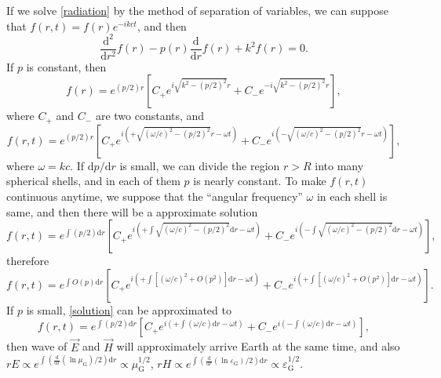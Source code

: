 \documentclass{article}
\def\d{\mathrm{d}}
\begin{document}
If we solve \eqref{radiation} by the method of separation of variables, we can suppose that $f(r,t)=f(r)e^{-ikct}$, and then
\begin{equation}\label{radiation_r}
    \frac{\d^2}{\d r^2}f(r)-p(r)\frac{\d}{\d r}f(r)+k^2f(r)=0.
\end{equation}
If $p$ is constant, then
\begin{equation}
    f(r)=e^{(p/2)r}[C_+e^{i\sqrt{k^2-(p/2)^2}r}+C_-e^{-i\sqrt{k^2-(p/2)^2}r}],
\end{equation}
where $C_+$ and $C_-$ are two constants, and
\begin{equation}
    f(r,t)=e^{(p/2)r}[C_+e^{i(+\sqrt{(\omega/c)^2-(p/2)^2}r-\omega t)}+C_-e^{i(-\sqrt{(\omega/c)^2-(p/2)^2}r-\omega t)}],
\end{equation}
where $\omega=kc$. If $\d p/\d r$ is small, we can divide the region $r> R$ into many spherical shells, and in each of them $p$ is nearly constant. To make $f(r,t)$ continuous anytime, we suppose that the ``angular frequency'' $\omega$ in each shell is same, and then there will be a approximate solution
\begin{equation}\label{solution}
    f(r,t)=e^{\int(p/2)\d r}[C_+e^{i(+\int\sqrt{(\omega/c)^2-(p/2)^2}\d r-\omega t)}+C_-e^{i(-\int\sqrt{(\omega/c)^2-(p/2)^2}\d r-\omega t)}],
\end{equation}
therefore
\begin{equation}
    f(r,t)=e^{\int O(p)\d r}[C_+e^{i(+\int[(\omega/c)^2+O(p^2)]\d r-\omega t)}+C_-e^{i(+\int[(\omega/c)^2+O(p^2)]\d r-\omega t)}].
\end{equation}
If $p$ is small, \eqref{solution} can be approximated to
\begin{equation}
    f(r,t)=e^{\int(p/2)\d r}[C_+e^{i(+\int(\omega/c)\d r-\omega t)}+C_-e^{i(-\int(\omega/c)\d r-\omega t)}],
\end{equation}
then wave of $\vec{E}$ and $\vec{H}$ will approximately arrive Earth at the same time, and also $rE \propto e^{\int(\frac{\d}{\d r}(\ln\mu_{\text{G}})/2)\d r} \propto \mu_{\text{G}}^{1/2}$, $rH\propto e^{\int(\frac{\d}{\d r}(\ln\varepsilon_{\text{G}})/2)\d r} \propto \varepsilon_{\text{G}}^{1/2}$.
\end{document}
